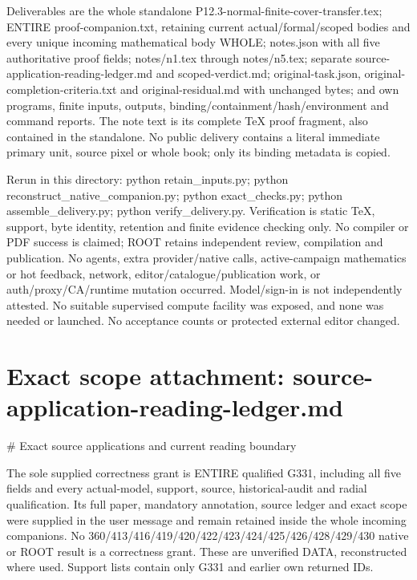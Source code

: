 \documentclass[11pt]{article}
\begin{document}
Deliverables are the whole standalone
P12.3-normal-finite-cover-transfer.tex; ENTIRE proof-companion.txt,
retaining current actual/formal/scoped bodies and every unique incoming
mathematical body WHOLE; notes.json with all five authoritative proof
fields; notes/n1.tex through notes/n5.tex; separate
source-application-reading-ledger.md and scoped-verdict.md;
original-task.json, original-completion-criteria.txt and
original-residual.md with unchanged bytes; and own programs, finite inputs,
outputs, binding/containment/hash/environment and command reports.
The note text is its complete TeX proof fragment, also contained in the
standalone. No public delivery contains a literal immediate primary unit,
source pixel or whole book; only its binding metadata is copied.

Rerun in this directory: python retain\_inputs.py;
python reconstruct\_native\_companion.py; python exact\_checks.py;
python assemble\_delivery.py; python verify\_delivery.py.
Verification is static TeX, support, byte identity, retention and finite
evidence checking only. No compiler or PDF success is claimed; ROOT
retains independent review, compilation and publication. No agents,
extra provider/native calls, active-campaign mathematics or hot feedback,
network, editor/catalogue/publication work, or auth/proxy/CA/runtime
mutation occurred. Model/sign-in is not independently attested.
No suitable supervised compute facility was exposed, and none was needed
or launched. No acceptance counts or protected external editor changed.

\appendix
\section{Exact scope attachment: source-application-reading-ledger.md}
\# Exact source applications and current reading boundary

The sole supplied correctness grant is ENTIRE qualified G331, including all five fields and every actual-model, support, source, historical-audit and radial qualification. Its full paper, mandatory annotation, source ledger and exact scope were supplied in the user message and remain retained inside the whole incoming companions. No 360/413/416/419/420/422/423/424/425/426/428/429/430 native or ROOT result is a correctness grant. These are unverified DATA, reconstructed where used. Support lists contain only G331 and earlier own returned IDs.
\end{document}
